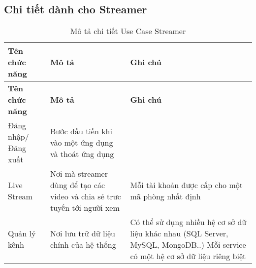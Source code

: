 \subsection{Chi tiết dành cho Streamer}
\begin{center}
\begin{longtabu} to 
\caption{Mô tả chi tiết Use Case Streamer} \\
\hline \textbf{Tên chức năng} & \textbf{Mô tả} & \textbf{Ghi chú} \\ \hline
\endfirsthead
\hline \textbf{Tên chức năng} & \textbf{Mô tả} & \textbf{Ghi chú} \\ \hline
\endhead
\hline
\endfoot
Đăng nhập/Đăng xuất &  Bước đầu tiến khi vào một ứng dụng và thoát ứng dụng  &
\\ \hline
Live Stream &  Nơi mà streamer dùng để tạo các video và chia sẻ trưc tuyến tới người xem & Mỗi tài khoản được cấp cho một mã phòng nhất định
\\ \hline
Quản lý kênh & Nơi lưu trữ dữ liệu chính của hệ thống & Có thể sử dụng nhiều hệ cơ sở dữ liệu khác nhau (SQL Server, MySQL, MongoDB..)
Mỗi service có một hệ cơ sở dữ liệu riêng biệt
\end{longtabu}
\end{center}


